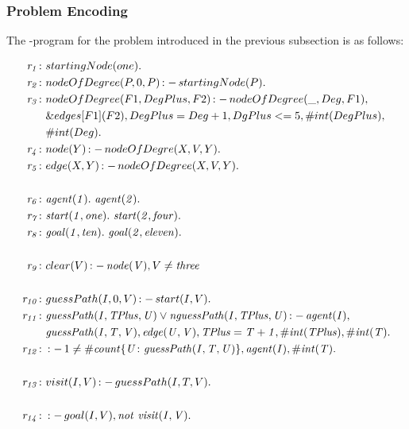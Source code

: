 \documentclass[a4paper, titlepage]{article}
\newcommand{\ext}[3]{\ensuremath{\&{#1}[#2](#3)}}
\DeclareMathOperator{\leftimpl}{:-}
\newcommand{\row}[1]{%
  \ensuremath{\it \color{black} #1 \color{black}}%
}
\begin{document}
\subsubsection{Problem Encoding}
The \hex-program for the problem introduced in the previous 
subsection is as follows:
\begin{exmp}
\label{pathfindingAgent}
\begin{align*}
\row{r_1} \colon & startingNode(one). \\
\row{r_2} \colon & nodeOfDegree(P,0,P) \leftimpl startingNode(P). 
\\
\row{r_3} \colon & nodeOfDegree(F1, DegPlus, F2) \leftimpl 
nodeOfDegree(\_, Deg, F1), \\ & \ext{edges}{F1}{F2}, 
DegPlus=Deg+1, DgPlus <= 5, \#int(DegPlus), \\ &\#int(Deg). 
\\
\row{r_4} \colon & node(Y) \leftimpl nodeOfDegre(X, V, Y).  \\
\row{r_5} \colon & edge(X,Y) \leftimpl nodeOfDegree(X,V,Y).\\
\\
\row{r_6} \colon &  \mathit{agent(1). } \ \mathit{ agent(2). }\\
\row{r_7} \colon & \mathit{start(1,one).} \ \mathit{ 
start(2,four).} \\
\row{r_8} \colon & \mathit{goal(1,ten).} \ \mathit{ 
goal(2,eleven).} \\
\\
\row{r_9} \colon & clear(V) \leftimpl \mathit{node(V)}, V \neq 
\mathit{three}\\ 
\\
\row{r_{10}} \colon & guessPath(I,0,V) \leftimpl start(I,V). \\
\row{r_{11}} \colon &  \mathit{guessPath(I, TPlus, U)} \vee 
\mathit{nguessPath(I, TPlus, U)} \leftimpl 
\mathit{agent(I)}, \\ &  \mathit{guessPath(I, T, V)},  
\mathit{edge(U,V)}, \mathit{TPlus=T+1}, 
\mathit{\#int(TPlus)}, \mathit{\#int(T).}  \\
\row{r_{12}} \colon &  \leftimpl 1 \neq \mathit{\#count\{ U 
\colon guessPath(I, T, U) \}}, \mathit{agent(I)}, 
\mathit{\#int(T)}.  \\
\\
\row{\row{r_{13}}} \colon &  visit(I, V) \leftimpl guessPath(I,T,V). \\
\\
\row{r_{14}} \colon & \leftimpl goal(I, V), \mathit{not} \  
\mathit{visit(I, V).} \\

\end{align*}
\end{exmp}
\end{document}
